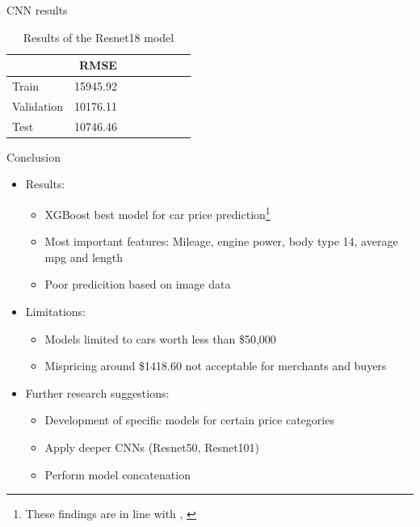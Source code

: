 \documentclass{beamer}
\begin{document}
    \begin{frame}{CNN results}
    \begin{table}[h]
    \centering
    \caption{Results of the Resnet18 model}
    \label{Results CNN}
    \begin{tabular}{lrrrrrrr}
    \toprule
           & RMSE \\
    \midrule
    Train & 15945.92\\
    Validation & 10176.11\\
    Test & 10746.46\\
    \bottomrule
    \end{tabular}
    \end{table}
        
    \end{frame}



    \begin{frame}{Conclusion} 

    \begin{itemize}
        \item Results:
            \begin{itemize}
                \item XGBoost best model for car price prediction\footnote{These findings are in line with \cite{Pudaruth2014}, \cite{Gajera2021}}
                \item Most important features: Mileage, engine power, body type 14, average mpg and length
                \item Poor predicition based on image data
            \end{itemize}
        \item Limitations:
            \begin{itemize}
                \item Models limited to cars worth less than \$50,000
                \item Mispricing around \$1418.60 not acceptable for merchants and buyers
            \end{itemize}
        \item Further research suggestions:
            \begin{itemize}
                \item Development of specific models for certain price categories
                \item Apply deeper CNNs (Resnet50, Resnet101)
                \item Perform model concatenation
            \end{itemize}
    \end{itemize}
\end{frame}
\end{document}
